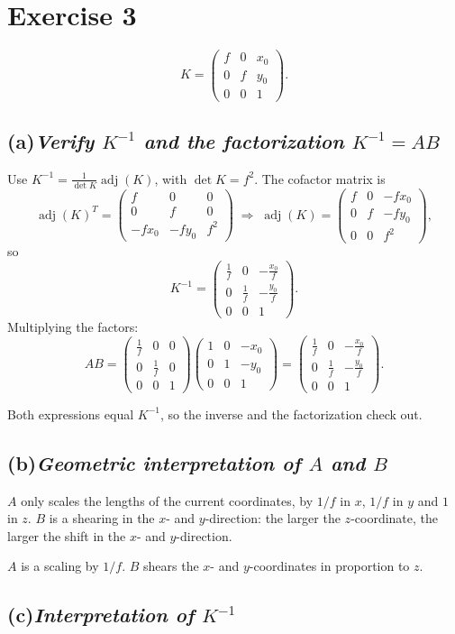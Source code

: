 \documentclass[11pt,a4paper]{article}
\newcommand{\vect}[1]{
    \begin{pmatrix}#1
\end{pmatrix}}
\newcommand{\exercise}[1]{
\section*{Exercise #1}}
\newcommand{\task}[2]{
\subsection*{#1\quad\normalfont\textit{#2}}}
\begin{document}
\exercise{3}

\[
    K = \vect{f&0&x_0\\0&f&y_0\\0&0&1}.
\]

\task{(a)}{Verify $K^{-1}$ and the factorization $K^{-1} = AB$}

Use $K^{-1} = \frac{1}{\det K}\operatorname{adj}(K)$, with $\det K =
f^2$. The cofactor matrix is
\[
    \operatorname{adj}(K)^T = \vect{f&0&0\\0&f&0\\-fx_0&-fy_0&f^2}
    \;\Longrightarrow\;
    \operatorname{adj}(K) = \vect{f&0&-fx_0\\0&f&-fy_0\\0&0&f^2},
\]
so
\[
    K^{-1} =
    \vect{\tfrac{1}{f}&0&-\tfrac{x_0}{f}\\[2pt]0&\tfrac{1}{f}&-\tfrac{y_0}{f}\\[2pt]0&0&1}.
\]
Multiplying the factors:
\[
    AB =
    \vect{\tfrac{1}{f}&0&0\\[2pt]0&\tfrac{1}{f}&0\\[2pt]0&0&1}\vect{1&0&-x_0\\0&1&-y_0\\0&0&1}
    =
    \vect{\tfrac{1}{f}&0&-\tfrac{x_0}{f}\\[2pt]0&\tfrac{1}{f}&-\tfrac{y_0}{f}\\[2pt]0&0&1}.
\]
\begin{answer}
    Both expressions equal $K^{-1}$, so the inverse and the
    factorization check out.
\end{answer}

\task{(b)}{Geometric interpretation of $A$ and $B$}

$A$ only scales the lengths of the current coordinates, by $1/f$ in
$x$, $1/f$ in $y$ and $1$ in $z$.
$B$ is a shearing in the $x$- and $y$-direction: the larger the
$z$-coordinate, the larger the shift in
the $x$- and $y$-direction.
\begin{answer}
    $A$ is a scaling by $1/f$. $B$ shears the $x$- and
    $y$-coordinates in proportion to $z$.
\end{answer}

\task{(c)}{Interpretation of $K^{-1}$}
\end{document}
